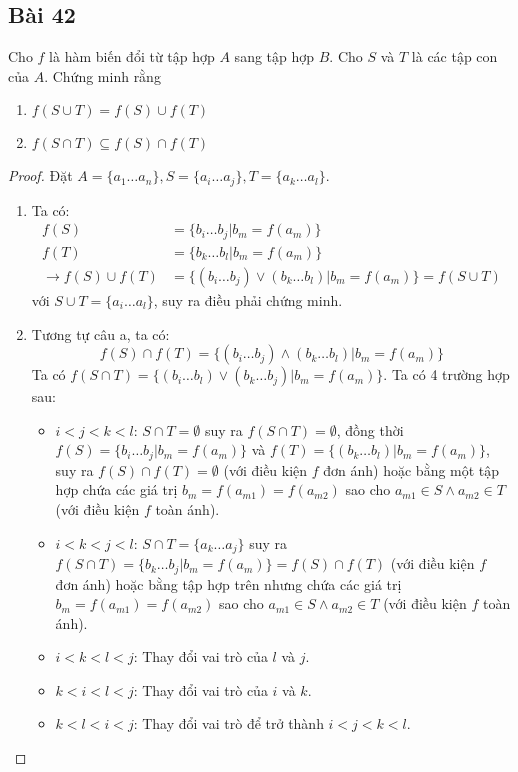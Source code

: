 \subsection*{Bài 42}
Cho $f$ là hàm biến đổi từ tập hợp $A$ sang tập hợp $B$. Cho $S$ và $T$ là các tập con của $A$. Chứng minh rằng
\begin{enumerate}[label=\alph*)]
    \item $f(S\cup T)=f(S)\cup f(T)$
    \item $f(S\cap T)\subseteq f(S)\cap f(T)$
\end{enumerate}
\begin{proof}
    Đặt $A=\{a_1\dots a_n\},S=\{a_i\dots a_j\},T=\{a_k\dots a_l\}$.
    \begin{enumerate}[label=\alph*)]
        \item Ta có: \begin{align*}
            f(S)&=\{b_i\dots b_j|b_m=f(a_m)\}\\
            f(T)&=\{b_k\dots b_l|b_m=f(a_m)\}\\
            \rightarrow f(S)\cup f(T)&=\{(b_i\dots b_j)\lor(b_k\dots b_l)|b_m=f(a_m)\}=f(S\cup T)
        \end{align*}
        với $S\cup T=\{a_i\dots a_l\}$, suy ra điều phải chứng minh.
        \item Tương tự câu a, ta có: $$f(S)\cap f(T)=\{(b_i\dots b_j)\land(b_k\dots b_l)|b_m=f(a_m)\}$$
        Ta có $f(S\cap T)=\{(b_i\dots b_l)\lor(b_k\dots b_j)|b_m=f(a_m)\}$. Ta có 4 trường hợp sau: \begin{itemize}
            \item $i<j<k<l$: $S\cap T=\emptyset$ suy ra $f(S\cap T)=\emptyset$, đồng thời $f(S)=\{b_i\dots b_j|b_m=f(a_m)\}$ và $f(T)=\{(b_k\dots b_l)|b_m=f(a_m)\}$, suy ra $f(S)\cap f(T)=\emptyset$ (với điều kiện $f$ đơn ánh) hoặc bằng một tập hợp chứa các giá trị $b_m=f(a_{m1})=f(a_{m2})$ sao cho $a_{m1}\in S\land a_{m2}\in T$ (với điều kiện $f$ toàn ánh).
            \item $i<k<j<l$: $S\cap T=\{a_k\dots a_j\}$ suy ra $f(S\cap T)=\{b_k\dots b_j|b_m=f(a_m)\}=f(S)\cap f(T)$ (với điều kiện $f$ đơn ánh) hoặc bằng tập hợp trên nhưng chứa các giá trị $b_m=f(a_{m1})=f(a_{m2})$ sao cho $a_{m1}\in S\land a_{m2}\in T$ (với điều kiện $f$ toàn ánh).
            \item $i<k<l<j$: Thay đổi vai trò của $l$ và $j$.
            \item $k<i<l<j$: Thay đổi vai trò của $i$ và $k$.
            \item $k<l<i<j$: Thay đổi vai trò để trở thành $i<j<k<l$.
        \end{itemize}
    \end{enumerate}
\end{proof}
